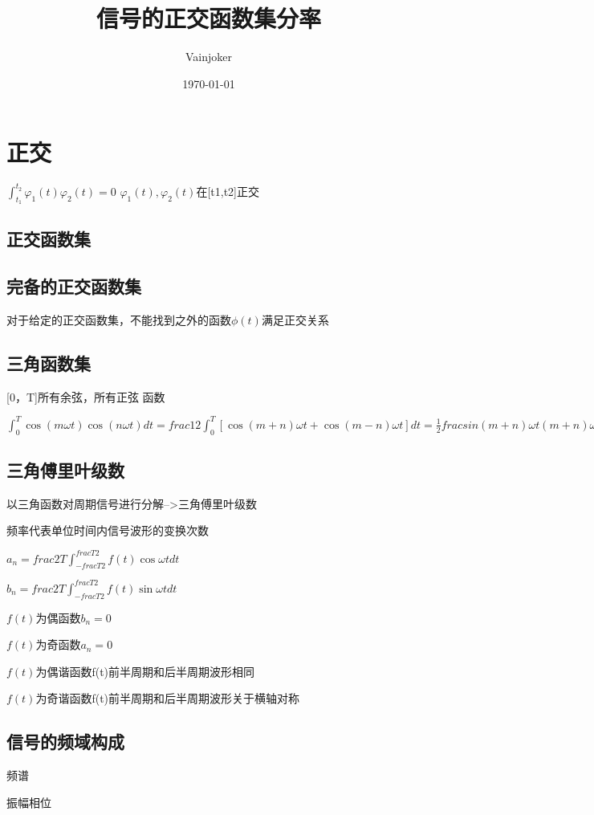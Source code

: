 \documentclass{article}
\title{信号的正交函数集分率}
\author{Vainjoker}
\date{\today}
\begin{document}
    \maketitle
    \newpage

    \section{正交}

    $\int_{t_1}^{t_2}\varphi_1(t)\varphi_2(t)=0$
    $\varphi_1(t),\varphi_2(t)$在[t1,t2]正交

    \subsection{正交函数集}

\subsection{完备的正交函数集}

对于给定的正交函数集，不能找到之外的函数$\phi(t)$满足正交关系

\subsection{三角函数集}

[0，T]所有余弦，所有正弦 函数


$\int_{0}^{T}\cos(m\omega t)\cos(n\omega t)dt=frac{1}{2}\int_{0}^{T}[\cos(m+n)\omega t+\cos(m-n)\omega t]dt=\frac{1}{2}frac{sin(m+n)\omega t}{(m+n)\omega}$

\subsection{三角傅里叶级数}

以三角函数对周期信号进行分解-->三角傅里叶级数

频率代表单位时间内信号波形的变换次数

$a_n=frac{2}{T}\int_{-frac{T}{2}}^{frac{T}{2}}f(t)\cos\omega tdt$

$b_n=frac{2}{T}\int_{-frac{T}{2}}^{frac{T}{2}}f(t)\sin\omega tdt$

$f(t)$为偶函数$b_n=0$

$f(t)$为奇函数$a_n=0$

$f(t)$为偶谐函数f(t)前半周期和后半周期波形相同

$f(t)$为奇谐函数f(t)前半周期和后半周期波形关于横轴对称

\subsection{信号的频域构成}
频谱

振幅相位



   
\end{document}
